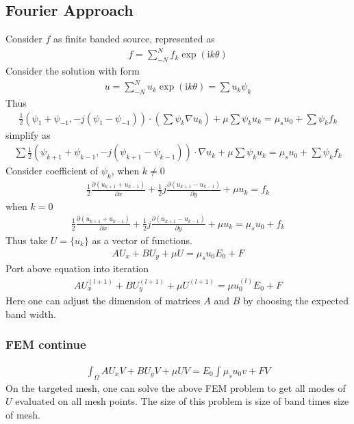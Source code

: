 \documentclass[12pt,a4paper]{article}
\begin{document}
\subsection{Fourier Approach}
Consider $f$ as finite banded source, represented as 
\begin{eqnarray}
f = \sum_{-N}^{N} f_k \exp({\mathrm{i}k\theta})
\end{eqnarray}
Consider the solution with form 
\begin{eqnarray}
u = \sum_{-N}^{N} u_k \exp({\mathrm{i}k\theta}) =\sum u_k\psi_k
\end{eqnarray}
Thus
\begin{eqnarray}
\frac{1}{2}(\psi_1 + \psi_{-1}, -j(\psi_1 - \psi_{-1}))\cdot (\sum \psi_k\nabla u_k) + \mu \sum \psi_k u_k = \mu_s u_0 + \sum \psi_k f_k
\end{eqnarray}
simplify as
\begin{eqnarray}
\sum \frac{1}{2}(\psi_{k+1}+\psi_{k-1}, -j(\psi_{k+1} - \psi_{k-1}))\cdot \nabla u_k + \mu \sum \psi_k u_k = \mu_s u_0 + \sum \psi_k f_k
\end{eqnarray}
Consider coefficient of $\psi_k$, when $k\neq 0$
\begin{eqnarray}
\frac{1}{2} \frac{\partial (u_{k+1} + u_{k-1})}{\partial x} + \frac{1}{2}j \frac{\partial (u_{k+1} - u_{k-1})}{\partial y} + \mu u_k = f_k
\end{eqnarray}
when $k=0$
\begin{eqnarray}
\frac{1}{2} \frac{\partial (u_{k+1} + u_{k-1})}{\partial x} + \frac{1}{2}j \frac{\partial (u_{k+1} - u_{k-1})}{\partial y} + \mu u_k = \mu_s u_0 +f_k
\end{eqnarray}
Thus take $U = \{u_k\}$ as a vector of functions.
\begin{eqnarray}
A U_x+ B U_y + \mu U = \mu_s u_0 E_0 + F
\end{eqnarray}
Port above equation into iteration
\begin{eqnarray}
A U_x^{(l+1)} + B U_y^{(l+1)} + \mu U^{(l+1)} = \mu u^{(l)}_0 E_0 + F
\end{eqnarray}
Here one can adjust the dimension of matrices $A$ and $B$ by choosing the expected band width.
\subsubsection{FEM continue}
\begin{eqnarray}
\int_{\Omega} A U_x V + B U_y V + \mu UV = E_0\int \mu_s u_0 v + FV 
\end{eqnarray}
On the targeted mesh, one can solve the above FEM problem to get all modes of $U$ evaluated on all mesh points. The size of this problem is size of band times size of mesh. 
\end{document}
